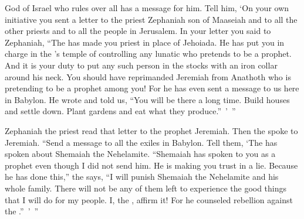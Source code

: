 {{}
God
of Israel
who rules over all
has
a message for him. Tell
him, ‘On your own initiative
you
sent
a letter
to
the priest
Zephaniah
son
of Maaseiah
and to
all
the other priests
and to
all
the people
in Jerusalem.
In your letter you said to Zephaniah,
“The
{}
has made
you priest
in place
of Jehoiada.
He has put you in charge
in the
{}’s
temple
of controlling
any lunatic who pretends to
be a prophet.
And it is your duty to
put
any such person in the stocks
with an iron collar around his neck.
You should have
reprimanded Jeremiah
from Anathoth
who is pretending to be a prophet among you!
For
he has even
sent
a message to
us here in Babylon.
He wrote and told
us, “You will be there a long
time. Build
houses
and settle down.
Plant
gardens
and eat
what they produce.” ’ ”
\par }{\PP {}Zephaniah
the priest
read
that
letter
to the prophet
Jeremiah.
Then the
{}
spoke
to Jeremiah.
“Send
a message to all
the exiles
in Babylon. Tell
them, ‘The
{}
has spoken
about
Shemaiah
the Nehelamite.
“Shemaiah
has spoken to you as
a prophet
even though I
did not
send
him. He is making you trust
in
a lie.
Because
he has done this,”
the
{}
says,
“I
will punish
Shemaiah
the Nehelamite
and his whole family.
There will not
be
any
of them
left to experience
the good
things that
I
will do
for my people.
I, the
{}, affirm
it! For
he counseled
rebellion against
the
{}.” ’ ”

\par }

